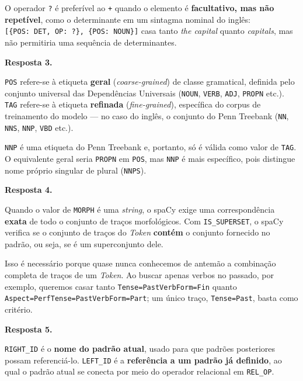 \documentclass[
  brazilian,
]{article}
\begin{document}
O operador \texttt{?} é preferível ao \texttt{+} quando o elemento é
\textbf{facultativo, mas não repetível}, como o determinante em um
sintagma nominal do inglês:
\texttt{{[}\{\textquotesingle{}POS\textquotesingle{}:\ \textquotesingle{}DET\textquotesingle{},\ \textquotesingle{}OP\textquotesingle{}:\ \textquotesingle{}?\textquotesingle{}\},\ \{\textquotesingle{}POS\textquotesingle{}:\ \textquotesingle{}NOUN\textquotesingle{}\}{]}}
casa tanto \emph{the capital} quanto \emph{capitals}, mas não permitiria
uma sequência de determinantes.

\textbf{Resposta 3.}

\texttt{POS} refere-se à etiqueta \textbf{geral} (\emph{coarse-grained})
de classe gramatical, definida pelo conjunto universal das Dependências
Universais (\texttt{NOUN}, \texttt{VERB}, \texttt{ADJ}, \texttt{PROPN}
etc.). \texttt{TAG} refere-se à etiqueta \textbf{refinada}
(\emph{fine-grained}), específica do corpus de treinamento do modelo ---
no caso do inglês, o conjunto do Penn Treebank (\texttt{NN},
\texttt{NNS}, \texttt{NNP}, \texttt{VBD} etc.).

\texttt{NNP} é uma etiqueta do Penn Treebank e, portanto, só é válida
como valor de \texttt{TAG}. O equivalente geral seria \texttt{PROPN} em
\texttt{POS}, mas \texttt{NNP} é mais específico, pois distingue nome
próprio singular de plural (\texttt{NNPS}).

\textbf{Resposta 4.}

Quando o valor de \texttt{MORPH} é uma \emph{string}, o spaCy exige uma
correspondência \textbf{exata} de todo o conjunto de traços
morfológicos. Com \texttt{IS\_SUPERSET}, o spaCy verifica se o conjunto
de traços do \emph{Token} \textbf{contém} o conjunto fornecido no
padrão, ou seja, se é um superconjunto dele.

Isso é necessário porque quase nunca conhecemos de antemão a combinação
completa de traços de um \emph{Token}. Ao buscar apenas verbos no
passado, por exemplo, queremos casar tanto
\texttt{Tense=Past\textbar{}VerbForm=Fin} quanto
\texttt{Aspect=Perf\textbar{}Tense=Past\textbar{}VerbForm=Part}; um
único traço, \texttt{Tense=Past}, basta como critério.

\textbf{Resposta 5.}

\texttt{RIGHT\_ID} é o \textbf{nome do padrão atual}, usado para que
padrões posteriores possam referenciá-lo. \texttt{LEFT\_ID} é a
\textbf{referência a um padrão já definido}, ao qual o padrão atual se
conecta por meio do operador relacional em \texttt{REL\_OP}.
\end{document}
